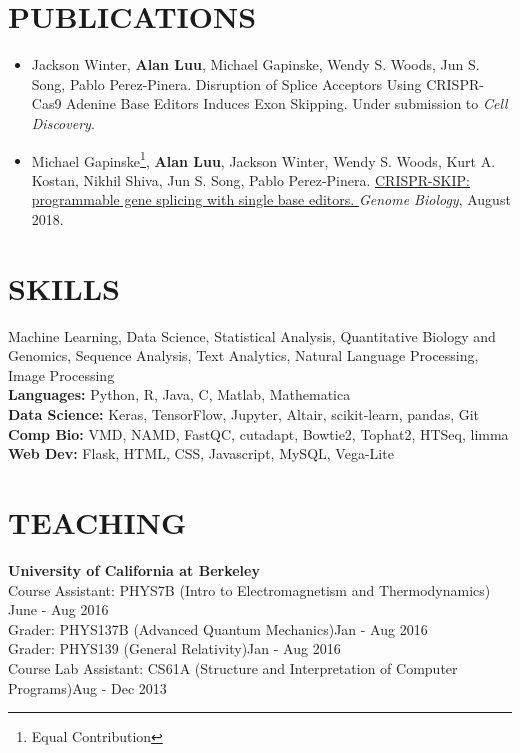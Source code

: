 \documentclass{res}
\begin{document}
\begin{resume}
\begin{itemize}
\end{itemize}
\newpage
\section{PUBLICATIONS}
\begin{itemize}[leftmargin=0in,label={}]
\item Jackson Winter, \textbf{Alan Luu}, Michael Gapinske, Wendy S. Woods,
Jun S. Song, Pablo Perez-Pinera. Disruption of Splice Acceptors Using CRISPR-Cas9 Adenine Base Editors Induces Exon Skipping. Under submission to \textit{Cell Discovery}.
\item Michael Gapinske\footnote{Equal Contribution}, \textbf{Alan Luu}\footnotemark[1], Jackson Winter, Wendy S. Woods, Kurt A. Kostan, Nikhil Shiva, Jun S. Song, Pablo Perez-Pinera. \href{https://www.ncbi.nlm.nih.gov/pmc/articles/PMC6092781/}{CRISPR-SKIP: programmable gene splicing with single base editors.
} \textit{Genome Biology}, August 2018.
\end{itemize}
\vspace{-10pt}
\section{SKILLS}
Machine Learning, Data Science, Statistical Analysis, Quantitative Biology and Genomics, Sequence Analysis, Text Analytics, Natural Language Processing, Image Processing %
\\ \textbf{Languages:} Python, R, Java, C, Matlab, Mathematica
\\ \textbf{Data Science:} Keras, TensorFlow, Jupyter, Altair, scikit-learn, pandas, Git
\\ \textbf{Comp Bio:} VMD, NAMD, FastQC, cutadapt, Bowtie2, Tophat2, HTSeq, limma
\\ \textbf{Web Dev:} Flask, HTML, CSS, Javascript, MySQL, Vega-Lite
\vspace{-10pt}
\section{TEACHING}
   \textbf{University of California at Berkeley}
   \\Course Assistant: PHYS7B (Intro to Electromagnetism and Thermodynamics) \hfill June - Aug 2016
   \\Grader: PHYS137B (Advanced Quantum Mechanics)\hfill Jan - Aug 2016
   \\Grader: PHYS139 (General Relativity)\hfill Jan - Aug 2016
   \\Course Lab Assistant: CS61A (Structure and Interpretation of Computer Programs)\hfill Aug - Dec 2013
\vspace{-10pt}

\end{resume}
\end{document}
